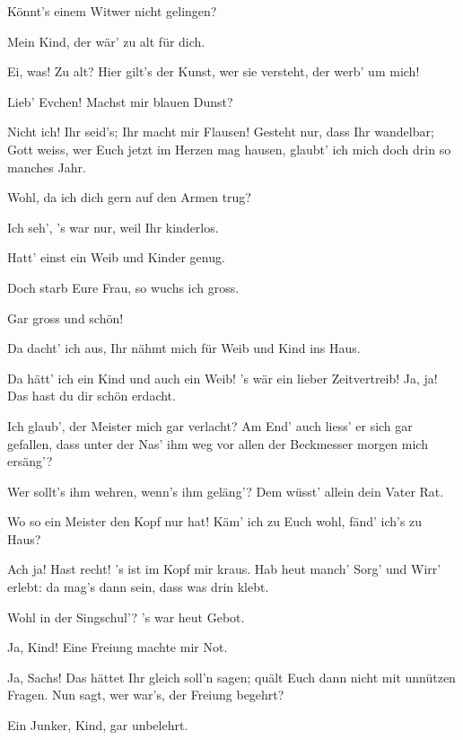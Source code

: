 \begin{drama}
\Evaspeaks
Könnt's einem Witwer nicht gelingen?

\Sachsspeaks
Mein Kind, der wär' zu alt für dich.

\Evaspeaks
Ei, was! Zu alt? Hier gilt's der Kunst,
wer sie versteht, der werb' um mich!

\Sachsspeaks
Lieb' Evchen! Machst mir blauen Dunst?

\Evaspeaks
Nicht ich! Ihr seid's; Ihr macht mir Flausen!
Gesteht nur, dass Ihr wandelbar;
Gott weiss, wer Euch jetzt im Herzen mag hausen,
glaubt' ich mich doch drin so manches Jahr.

\Sachsspeaks
Wohl, da ich dich gern auf den Armen trug?

\Evaspeaks
Ich seh', 's war nur, weil Ihr kinderlos.

\Sachsspeaks
Hatt' einst ein Weib und Kinder genug.

\Evaspeaks
Doch starb Eure Frau, so wuchs ich gross.

\Sachsspeaks
Gar gross und schön!

\Evaspeaks
Da dacht' ich aus,
Ihr nähmt mich für Weib und Kind ins Haus.

\Sachsspeaks
Da hätt' ich ein Kind und auch ein Weib!
's wär ein lieber Zeitvertreib!
Ja, ja! Das hast du dir schön erdacht.

\Evaspeaks
Ich glaub', der Meister mich gar verlacht?
Am End' auch liess' er sich gar gefallen,
dass unter der Nas' ihm weg vor allen
der Beckmesser morgen mich ersäng'?

\Sachsspeaks
Wer sollt's ihm wehren, wenn's ihm geläng'?
Dem wüsst' allein dein Vater Rat.

\Evaspeaks
Wo so ein Meister den Kopf nur hat!
Käm' ich zu Euch wohl, fänd' ich's zu Haus?

\Sachsspeaks


Ach ja! Hast recht! 's ist im Kopf mir kraus.
Hab heut manch' Sorg' und Wirr' erlebt:
da mag's dann sein, dass was drin klebt.

\Evaspeaks


Wohl in der Singschul'? 's war heut Gebot.

\Sachsspeaks
Ja, Kind! Eine Freiung machte mir Not.

\Evaspeaks
Ja, Sachs! Das hättet Ihr gleich soll'n sagen;
quält Euch dann nicht mit unnützen Fragen.
Nun sagt, wer war's, der Freiung begehrt?

\Sachsspeaks
Ein Junker, Kind, gar unbelehrt.


\end{drama}
